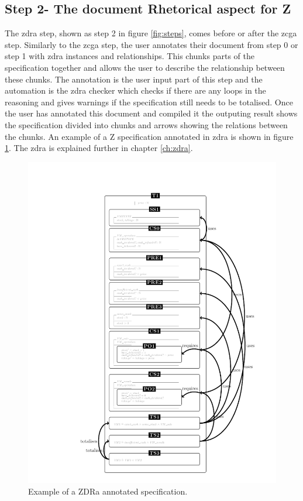 \subsection{Step 2- The document Rhetorical aspect for Z}

The \gls{zdra} step, shown as step 2 in figure \ref{fig:steps}, comes before or after the \gls{zcga} step. Similarly to the \gls{zcga} step, the user annotates their document from step 0 or step 1 with \gls{zdra} instances and relationships. This chunks parts of the specification together and allows the user to describe the relationship between these chunks. The annotation is the user input part of this step and the automation is the \gls{zdra} checker which checks if there are any loops in the reasoning and gives warnings if the specification still needs to be totalised. Once the user has annotated this document and compiled it the outputing result shows the specification divided into chunks and arrows showing the relations between the chunks. An example of a Z specification annotated in \gls{zdra} is shown in figure \ref{fig:zdraexample}. The \gls{zdra} is explained further in chapter \ref{ch:zdra}.

\begin{figure}[H]
 \begin{center}
 \includegraphics [scale=0.25]{Figures/Design/zdracomp.png}
 \caption{Example of a ZDRa annotated specification.}
 \label{fig:zdraexample}
\end{center}
\end{figure} 

